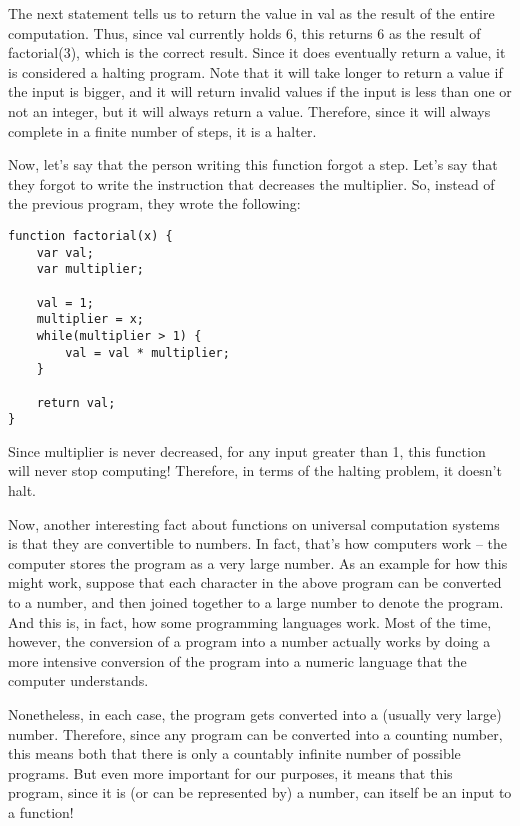 The next statement tells us to return the value in val as the result of the entire computation.  Thus, since val currently holds 6, this returns 6 as the result of factorial(3), which is the correct result.  Since it does eventually return a value, it is considered a halting program.  Note that it will take longer to return a value if the input is bigger, and it will return invalid values if the input is less than one or not an integer, but it will always return a value.  Therefore, since it will always complete in a finite number of steps, it is a halter.

Now, let's say that the person writing this function forgot a step.  Let's say that they forgot to write the instruction that decreases the multiplier.  So, instead of the previous program, they wrote the following:

\begin{verbatim}
function factorial(x) {
	var val;
	var multiplier;

	val = 1;
	multiplier = x;
	while(multiplier > 1) {
		val = val * multiplier;
	}

	return val;
}
\end{verbatim}

Since multiplier is never decreased, for any input greater than 1, this function will never stop computing!  Therefore, in terms of the halting problem, it doesn't halt.

Now, another interesting fact about functions on universal computation systems is that they are convertible to numbers.  In fact, that's how computers work -- the computer stores the program as a very large number.  As an example for how this might work, suppose that each character in the above program can be converted to a number, and then joined together to a large number to denote the program.  And this is, in fact, how some programming languages work.  Most of the time, however, the conversion of a program into a number actually works by doing a more intensive conversion of the program into a numeric language that the computer understands.  

Nonetheless, in each case, the program gets converted into a (usually very large) number.  Therefore, since any program can be converted into a counting number, this means both that there is only a countably infinite number of possible programs.  But even more important for our purposes, it means that this program, since it is (or can be represented by) a number, can itself be an input to a function!


